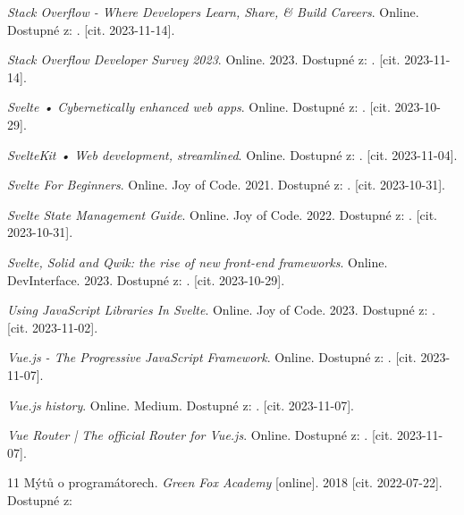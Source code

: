 \begin{thebibliography}{99}
\emph{Stack Overflow - Where Developers Learn, Share, \& Build Careers}. Online. Dostupné z: . [cit. 2023-11-14].

\emph{Stack Overflow Developer Survey 2023}. Online. 2023. Dostupné z: . [cit. 2023-11-14].

\emph{Svelte • Cybernetically enhanced web apps}. Online. Dostupné z: . [cit. 2023-10-29].

\emph{SvelteKit • Web development, streamlined}. Online. Dostupné z: . [cit. 2023-11-04].

\emph{Svelte For Beginners}. Online. Joy of Code. 2021. Dostupné z: . [cit. 2023-10-31].

\emph{Svelte State Management Guide}. Online. Joy of Code. 2022. Dostupné z: . [cit. 2023-10-31].

\emph{Svelte, Solid and Qwik: the rise of new front-end frameworks}. Online. DevInterface. 2023. Dostupné z: . [cit. 2023-10-29].

\emph{Using JavaScript Libraries In Svelte}. Online. Joy of Code. 2023. Dostupné z: . [cit. 2023-11-02].

\emph{Vue.js - The Progressive JavaScript Framework}. Online. Dostupné z: . [cit. 2023-11-07].

\emph{Vue.js history}. Online. Medium. Dostupné z: . [cit. 2023-11-07].

\emph{Vue Router | The official Router for Vue.js}. Online. Dostupné z: . [cit. 2023-11-07].



11 Mýtů o programátorech. \emph{Green Fox Academy} [online]. 2018 [cit. 2022-07-22]. Dostupné z: 


\end{thebibliography}
